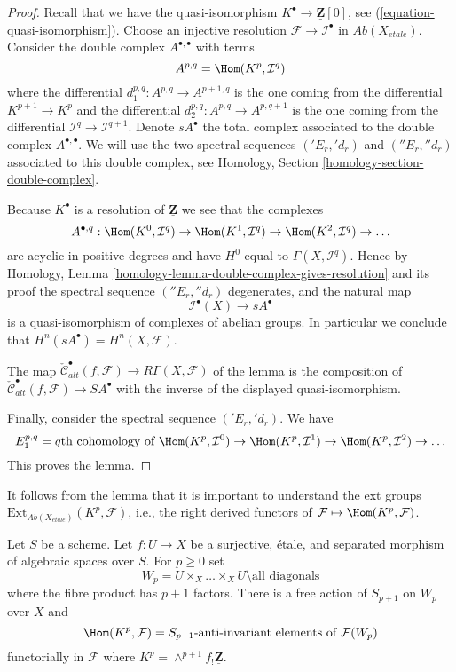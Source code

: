 \begin{proof}
Recall that we have the quasi-isomorphism
$K^\bullet \to \underline{\mathbf{Z}}[0]$, see
(\ref{equation-quasi-isomorphism}).
Choose an injective resolution $\mathcal{F} \to \mathcal{I}^\bullet$
in $\textit{Ab}(X_{\acute{e}tale})$. Consider the double complex
$A^{\bullet, \bullet}$ with terms
$$
A^{p, q} = \Hom(K^p, \mathcal{I}^q)
$$
where the differential $d_1^{p, q} : A^{p, q} \to A^{p + 1, q}$
is the one coming from the differential $K^{p + 1} \to K^p$
and the differential $d_2^{p, q} : A^{p, q} \to A^{p, q + 1}$ is the
one coming from the differential
$\mathcal{I}^q \to \mathcal{I}^{q + 1}$.
Denote $sA^\bullet$ the total complex associated to
the double complex $A^{\bullet, \bullet}$.
We will use the two spectral
sequences $({}'E_r, {}'d_r)$ and $({}''E_r, {}''d_r)$
associated to this double complex, see
Homology, Section \ref{homology-section-double-complex}.

\medskip\noindent
Because $K^\bullet$ is a resolution of $\underline{\mathbf{Z}}$
we see that the complexes
$$
A^{\bullet, q} :
\Hom(K^0, \mathcal{I}^q) \to
\Hom(K^1, \mathcal{I}^q) \to
\Hom(K^2, \mathcal{I}^q) \to \ldots
$$
are acyclic in positive degrees and have $H^0$ equal to
$\Gamma(X, \mathcal{I}^q)$. Hence by
Homology, Lemma \ref{homology-lemma-double-complex-gives-resolution}
and its proof the spectral sequence $({}''E_r, {}''d_r)$ degenerates,
and the natural map
$$
\mathcal{I}^\bullet(X) \longrightarrow sA^\bullet
$$
is a quasi-isomorphism of complexes of abelian groups. In particular
we conclude that $H^n(sA^\bullet) = H^n(X, \mathcal{F})$.

\medskip\noindent
The map $\check{\mathcal{C}}^\bullet_{alt}(f, \mathcal{F}) \to
R\Gamma(X, \mathcal{F})$ of the lemma is the composition of
$\check{\mathcal{C}}^\bullet_{alt}(f, \mathcal{F}) \to SA^\bullet$
with the inverse of the displayed quasi-isomorphism.

\medskip\noindent
Finally, consider the spectral sequence $({}'E_r, {}'d_r)$.
We have
$$
E_1^{p, q} = q\text{th cohomology of }
\Hom(K^p, \mathcal{I}^0) \to
\Hom(K^p, \mathcal{I}^1) \to
\Hom(K^p, \mathcal{I}^2) \to \ldots
$$
This proves the lemma.
\end{proof}

\noindent
It follows from the lemma that it is important to understand the
ext groups $\text{Ext}_{\textit{Ab}(X_{\acute{e}tale})}(K^p, \mathcal{F})$,
i.e., the right derived functors of
$\mathcal{F} \mapsto \Hom(K^p, \mathcal{F})$.

\begin{lemma}
\label{lemma-compute}
Let $S$ be a scheme. Let $f : U \to X$ be a surjective, \'etale, and separated
morphism of algebraic spaces over $S$. For $p \geq 0$ set
$$
W_p = U \times_X \ldots \times_X U \setminus \text{all diagonals}
$$
where the fibre product has $p + 1$ factors.
There is a free action of $S_{p + 1}$ on $W_p$ over $X$ and
$$
\Hom(K^p, \mathcal{F}) = S_{p + 1}\text{-anti-invariant elements of }
\mathcal{F}(W_p)
$$
functorially in $\mathcal{F}$ where
$K^p = \wedge^{p + 1}f_!\underline{\mathbf{Z}}$.
\end{lemma}

